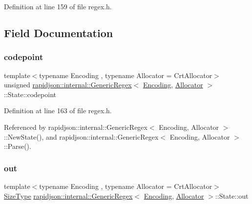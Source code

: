Definition at line 159 of file regex.\+h.



\subsection{Field Documentation}
\mbox{\label{structrapidjson_1_1internal_1_1_generic_regex_1_1_state_a82300a910e978ec41675df725d87dcd3}} 
\subsubsection{\texorpdfstring{codepoint}{codepoint}}
{\footnotesize\ttfamily template$<$typename Encoding , typename Allocator  = Crt\+Allocator$>$ \\
unsigned \mbox{\hyperlink{classrapidjson_1_1internal_1_1_generic_regex}{rapidjson\+::internal\+::\+Generic\+Regex}}$<$ \mbox{\hyperlink{classrapidjson_1_1_encoding}{Encoding}}, \mbox{\hyperlink{classrapidjson_1_1_allocator}{Allocator}} $>$\+::State\+::codepoint}



Definition at line 163 of file regex.\+h.



Referenced by rapidjson\+::internal\+::\+Generic\+Regex$<$ Encoding, Allocator $>$\+::\+New\+State(), and rapidjson\+::internal\+::\+Generic\+Regex$<$ Encoding, Allocator $>$\+::\+Parse().

\mbox{\label{structrapidjson_1_1internal_1_1_generic_regex_1_1_state_a6df788d7a28b25c65a20068dfdbe2fe1}} 
\subsubsection{\texorpdfstring{out}{out}}
{\footnotesize\ttfamily template$<$typename Encoding , typename Allocator  = Crt\+Allocator$>$ \\
\mbox{\hyperlink{namespacerapidjson_a44eb33eaa523e36d466b1ced64b85c84}{Size\+Type}} \mbox{\hyperlink{classrapidjson_1_1internal_1_1_generic_regex}{rapidjson\+::internal\+::\+Generic\+Regex}}$<$ \mbox{\hyperlink{classrapidjson_1_1_encoding}{Encoding}}, \mbox{\hyperlink{classrapidjson_1_1_allocator}{Allocator}} $>$\+::State\+::out}



